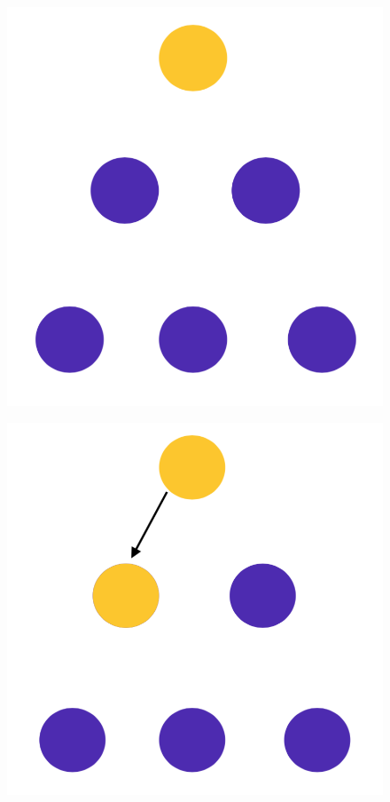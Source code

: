 \documentclass[10pt,a4paper]{article}
\begin{document}
\begin{figure}[h!]
\centering
\begin{minipage}{.3\textwidth}
  \includegraphics[width=.8\linewidth]{images/di-sch1.png}
  \label{fig:di-sch12}
\end{minipage}%
\begin{minipage}{.3\textwidth}
  \includegraphics[width=.8\linewidth]{images/di-sch2.png}
  \label{fig:di-sch2}
\end{minipage}%
\begin{minipage}{.3\textwidth}

\end{minipage}
\end{figure}
\end{document}
